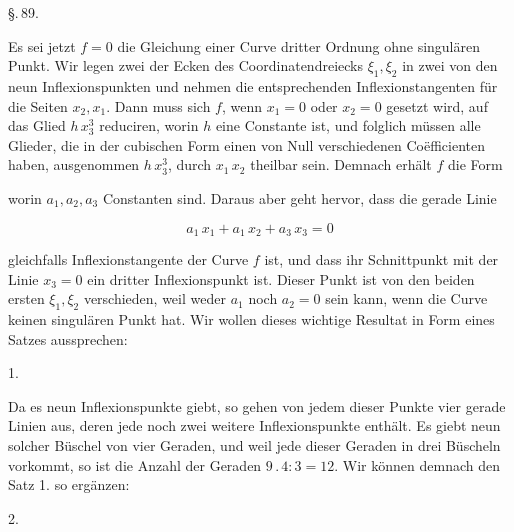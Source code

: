 \begin{center}
\S.\,89.

\end{center}

Es sei jetzt $f=0$ die Gleichung einer Curve dritter Ordnung
 ohne singulären Punkt. Wir legen zwei der Ecken des
Coordinatendreiecks $\xi_1, \xi_2$ in zwei von den neun Inflexionspunkten
und nehmen die entsprechenden Inflexionstangenten für die
Seiten $x_2, x_1$. Dann muss sich $f$, wenn $x_1=0$ oder $x_2=0$ gesetzt
wird, auf das Glied $h\,x_3^3$ reduciren, worin $h$ eine Constante ist,
und folglich müssen alle Glieder, die in der cubischen Form
einen von Null verschiedenen Coëfficienten haben, ausgenommen
$h\,x_3^3$, durch $x_1\,x_2$ theilbar sein. Demnach erhält $f$ die Form


worin $a_1, a_2, a_3$ Constanten sind. Daraus aber geht hervor, dass
die gerade Linie

\[
a_1\,x_1 + a_1\,x_2 + a_3\,x_3 = 0
\] %

gleichfalls Inflexionstangente der Curve $f$ ist, und dass ihr Schnittpunkt
 mit der Linie $x_3=0$ ein dritter Inflexionspunkt ist.
Dieser Punkt ist von den beiden ersten $\xi_1, \xi_2$ verschieden, weil
weder $a_1$ noch $a_2=0$ sein kann, wenn die Curve keinen singulären
 Punkt hat. Wir wollen dieses wichtige Resultat in Form
eines Satzes aussprechen:

1. 

Da es neun Inflexionspunkte giebt, so gehen von jedem
dieser Punkte vier gerade Linien aus, deren jede noch zwei
weitere Inflexionspunkte enthält. Es giebt neun solcher Büschel
von vier Geraden, und weil jede dieser Geraden in drei Büscheln
vorkommt, so ist die Anzahl der Geraden $9\,.\,4 : 3 = 12$. Wir
können demnach den Satz 1. so ergänzen:

2. 

